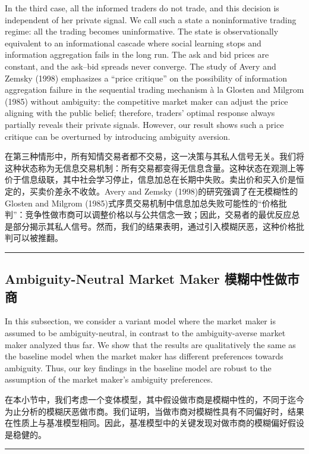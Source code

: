 \documentclass[12pt,a4paper]{article}
\newenvironment{original}{%
  \par\vspace{4pt}\noindent%
  \color{black}%
  \ignorespaces
}{%
  \par\vspace{2pt}%
}
\newenvironment{translation}{%
  \par\vspace{2pt}\noindent%
  \color{transblue}%
  \ignorespaces
}{%
  \par\vspace{4pt}\hrule\vspace{6pt}%
}
\begin{document}
\begin{original}
In the third case, all the informed traders do not trade, and this decision is independent of her private signal. We call such a state a noninformative trading regime: all the trading becomes uninformative. The state is observationally equivalent to an informational cascade where social learning stops and information aggregation fails in the long run. The ask and bid prices are constant, and the ask--bid spreads never converge. The study of Avery and Zemsky (1998) emphasizes a ``price critique'' on the possibility of information aggregation failure in the sequential trading mechanism \`a la Glosten and Milgrom (1985) without ambiguity: the competitive market maker can adjust the price aligning with the public belief; therefore, traders' optimal response always partially reveals their private signals. However, our result shows such a price critique can be overturned by introducing ambiguity aversion.
\end{original}
\begin{translation}
在第三种情形中，所有知情交易者都不交易，这一决策与其私人信号无关。我们将这种状态称为无信息交易机制：所有交易都变得无信息含量。这种状态在观测上等价于信息级联，其中社会学习停止，信息加总在长期中失败。卖出价和买入价是恒定的，买卖价差永不收敛。Avery and Zemsky (1998)的研究强调了在无模糊性的Glosten and Milgrom (1985)式序贯交易机制中信息加总失败可能性的``价格批判''：竞争性做市商可以调整价格以与公共信念一致；因此，交易者的最优反应总是部分揭示其私人信号。然而，我们的结果表明，通过引入模糊厌恶，这种价格批判可以被推翻。
\end{translation}

\newpage

\subsection{Ambiguity-Neutral Market Maker \hfill 模糊中性做市商}

\begin{original}
In this subsection, we consider a variant model where the market maker is assumed to be ambiguity-neutral, in contrast to the ambiguity-averse market maker analyzed thus far. We show that the results are qualitatively the same as the baseline model when the market maker has different preferences towards ambiguity. Thus, our key findings in the baseline model are robust to the assumption of the market maker's ambiguity preferences.
\end{original}
\begin{translation}
在本小节中，我们考虑一个变体模型，其中假设做市商是模糊中性的，不同于迄今为止分析的模糊厌恶做市商。我们证明，当做市商对模糊性具有不同偏好时，结果在性质上与基准模型相同。因此，基准模型中的关键发现对做市商的模糊偏好假设是稳健的。
\end{translation}
\end{document}
